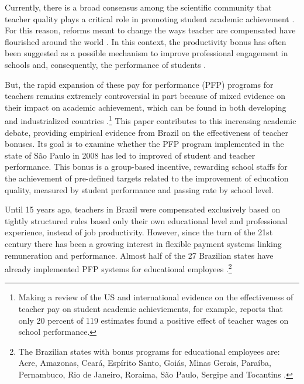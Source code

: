 \documentclass[a4paper, 12pt]{article}
\begin{document}
Currently, there is a broad consensus among the scientific community that teacher quality plays a critical role in promoting student academic achievement \citep[see e.g.][]{canales2018teacher, dee2015incentives, harris2011teacher}. For this reason, reforms meant to change the ways teacher are compensated have flourished around the world \citep{yuan2013incentive}. In this context, the productivity bonus has often been suggested as a possible mechanism to improve professional engagement in schools and, consequently, the performance of students \citep{loyalka2019pay, barrera2017teacher, muralidharan2011teacher}. 

But, the rapid expansion of these pay for performance (PFP) programs for teachers remains extremely controversial in part because of mixed evidence on their impact on academic achievement, which can be found in both developing and industrialized countries \citep{britton2016teacher}.\footnote{Making a review of the US and international evidence on the effectiveness of teacher pay on student academic achieviements, \citet{hanushek2003failure} for example, reports that only 20 percent of 119 estimates found a positive effect of teacher wages on school performance.} This paper contributes to this increasing academic debate, providing empirical evidence from Brazil on the effectiveness of teacher bonuses. Its goal is to examine whether the PFP program implemented in the state of São Paulo in 2008 has led to improved of student and teacher performance. This bonus is a group-based incentive, rewarding school staffs for the achievement of pre-defined targets related to the improvement of education quality, measured by student performance and passing rate by school level.




Until 15 years ago, teachers in Brazil were compensated exclusively based on tightly structured rules based only their own educational level and professional experience, instead of job productivity. However, since the turn of the 21st century there has been a growing interest in flexible payment systems linking remuneration and performance. Almost half of the 27 Brazilian states have already implemented PFP systems for educational employees \citep{scorzafave2016efeito}.\footnote{The Brazilian states with bonus programs for educational employees are: Acre, Amazonas, Ceará, Espírito Santo, Goiás, Minas Gerais, Paraíba, Pernambuco, Rio de Janeiro, Roraima, São Paulo, Sergipe and Tocantins \citep{scorzafave2016efeito}.} 
\end{document}
